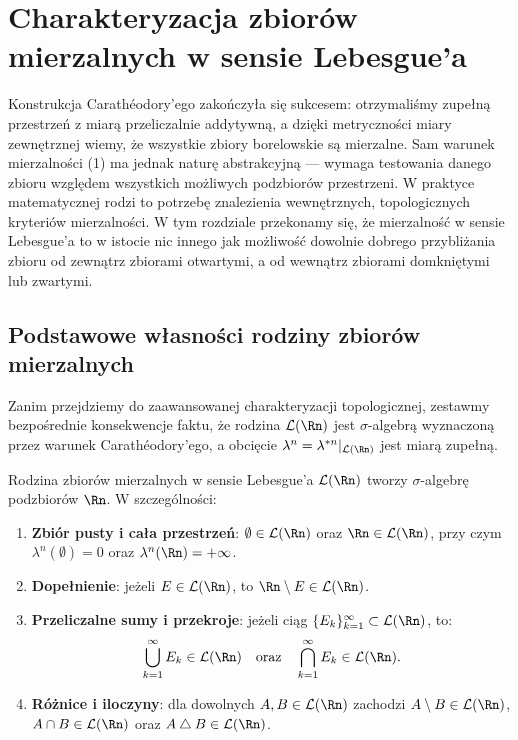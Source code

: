 \section{Charakteryzacja zbiorów mierzalnych w sensie Lebesgue'a}

Konstrukcja Carathéodory’ego zakończyła się sukcesem: otrzymaliśmy zupełną przestrzeń z miarą przeliczalnie addytywną, a dzięki metryczności miary zewnętrznej wiemy, że wszystkie zbiory borelowskie są mierzalne. Sam warunek mierzalności (1) ma jednak naturę abstrakcyjną — wymaga testowania danego zbioru względem wszystkich możliwych podzbiorów przestrzeni. W praktyce matematycznej rodzi to potrzebę znalezienia wewnętrznych, topologicznych kryteriów mierzalności. W tym rozdziale przekonamy się, że mierzalność w sensie Lebesgue'a to w istocie nic innego jak możliwość dowolnie dobrego przybliżania zbioru od zewnątrz zbiorami otwartymi, a od wewnątrz zbiorami domkniętymi lub zwartymi.

\subsection{Podstawowe własności rodziny zbiorów mierzalnych}
Zanim przejdziemy do zaawansowanej charakteryzacji topologicznej, zestawmy bezpośrednie konsekwencje faktu, że rodzina $\mathcal{L}(\Rn)$ jest $\sigma$-algebrą wyznaczoną przez warunek Carathéodory'ego, a obcięcie $\lambda^n = \lambda^{*n}|_{\mathcal{L}(\Rn)}$ jest miarą zupełną.
\begin{tw} Rodzina zbiorów mierzalnych w sensie Lebesgue'a $\mathcal{L}(\Rn)$ tworzy $\sigma$-algebrę podzbiorów $\Rn$. W szczególności:
    \begin{enumerate}
        \item \textbf{Zbiór pusty i cała przestrzeń}: $\emptyset \in \mathcal{L}(\Rn)$ oraz $\Rn \in \mathcal{L}(\Rn)$, przy czym $\lambda^n(\emptyset) = 0$ oraz $\lambda^n(\Rn) = +\infty$.

        \item \textbf{Dopełnienie}: jeżeli $E \in \mathcal{L}(\Rn)$, to $\Rn \setminus E \in \mathcal{L}(\Rn)$.

        \item \textbf{Przeliczalne sumy i przekroje}: jeżeli ciąg $\{E_k\}_{k=1}^\infty \subset \mathcal{L}(\Rn)$, to:
              \begin{equation*}
                  \bigcup_{k=1}^\infty E_k \in \mathcal{L}(\Rn) \quad \text{oraz} \quad \bigcap_{k=1}^\infty E_k \in \mathcal{L}(\Rn).
              \end{equation*}

        \item \textbf{Różnice i iloczyny}: dla dowolnych $A, B \in \mathcal{L}(\Rn)$ zachodzi $A \setminus B \in \mathcal{L}(\Rn)$, $A \cap B \in \mathcal{L}(\Rn)$ oraz $A \mathbin{\triangle} B \in \mathcal{L}(\Rn)$.

    \end{enumerate}
\end{tw}

